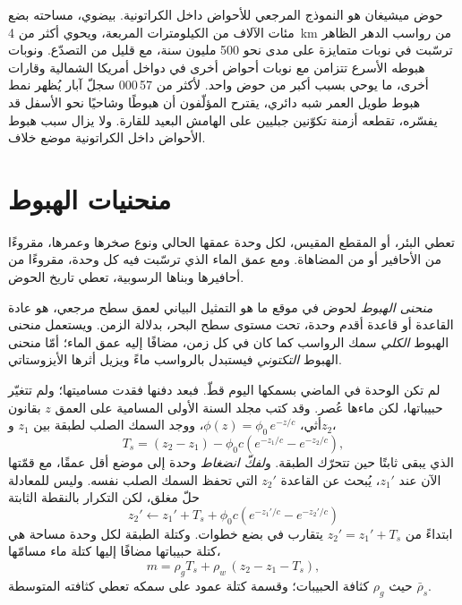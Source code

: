 حوض ميشيغان هو النموذج المرجعي للأحواض داخل الكراتونية. بيضوي، مساحته بضع مئات الآلاف
من الكيلومترات المربعة، ويحوي أكثر من \qty{4}{km} من رواسب الدهر الظاهر ترسّبت
في نوبات متمايزة على مدى نحو 500 مليون سنة، مع قليل من التصدّع. ونوبات هبوطه
الأسرع تتزامن مع نوبات أحواض أخرى في دواخل أمريكا الشمالية وقارات
أخرى، ما يوحي بسبب أكبر من حوض واحد.  لأكثر من 57\,000
سجلّ آبار يُظهر نمط هبوط طويل العمر شبه دائري، يقترح المؤلّفون أن
هبوطًا وشاحيًا نحو الأسفل قد يفسّره، تقطعه أزمنة تكوّنين جبليين على الهامش
البعيد للقارة. ولا يزال سبب هبوط الأحواض داخل الكراتونية موضع خلاف.

\section{منحنيات الهبوط}\label{sec:b2:basins-compared:curves}

تعطي البئر، أو المقطع المقيس، لكل وحدة عمقها الحالي ونوع صخرها وعمرها،
مقروءًا من الأحافير أو من المضاهاة. ومع عمق الماء الذي ترسّبت فيه كل وحدة،
مقروءًا من أحافيرها وبناها الرسوبية، تعطي تاريخ الحوض.

\begin{definition}\label{def:b2:basins-compared:curve}
\emph{منحنى الهبوط} لحوض في موقع ما هو التمثيل البياني لعمق
سطح مرجعي، هو عادة القاعدة أو قاعدة أقدم وحدة، تحت مستوى سطح البحر،
بدلالة الزمن. ويستعمل منحنى الهبوط \emph{الكلي} سمك الرواسب كما كان في كل
زمن، مضافًا إليه عمق الماء؛ أمّا منحنى الهبوط \emph{التكتوني} فيستبدل بالرواسب ماءً
ويزيل أثرها الأيزوستاتي.
\end{definition}

لم تكن الوحدة في الماضي بسمكها اليوم قطّ. فبعد دفنها فقدت مساميتها؛ ولم تتغيّر حبيباتها،
لكن ماءها عُصر. وقد كتب مجلد السنة الأولى المسامية على العمق
$z$ بقانون أثي، $\phi(z) = \phi_0\,e^{-z/c}$، ووجد السمك الصلب لطبقة بين
$z_1$ و$z_2$،
\[
  T_s = (z_2 - z_1) - \phi_0 c\left(e^{-z_1/c} - e^{-z_2/c}\right),
\]
الذي يبقى ثابتًا حين تتحرّك الطبقة. و\emph{لفكّ انضغاط} وحدة إلى موضع أقل عمقًا،
مع قمّتها الآن عند $z_1'$، يُبحث عن القاعدة $z_2'$ التي تحفظ السمك الصلب نفسه. وليس
للمعادلة حلّ مغلق، لكن التكرار بالنقطة الثابتة
\[
  z_2' \leftarrow z_1' + T_s + \phi_0 c\left(e^{-z_1'/c} - e^{-z_2'/c}\right)
\]
ابتداءً من $z_2' = z_1' + T_s$ يتقارب في بضع خطوات. وكتلة الطبقة لكل وحدة مساحة
هي كتلة حبيباتها مضافًا إليها كتلة ماء مسامّها،
\[
  m = \rho_g T_s + \rho_w\,(z_2 - z_1 - T_s),
\]
حيث $\rho_g$ كثافة الحبيبات؛ وقسمة كتلة عمود على سمكه تعطي
كثافته المتوسطة $\bar\rho_s$.

